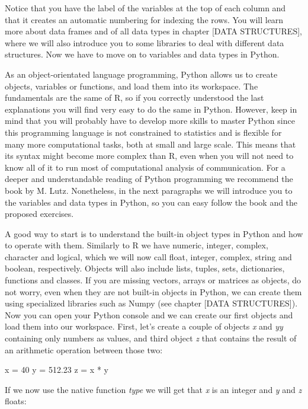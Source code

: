 Notice that you have the label of the variables at the top of each column and that it creates an automatic numbering for indexing the rows.  You will learn more about data frames and of all data types in chapter [DATA STRUCTURES], where we will also introduce you to some libraries to deal with different data structures. Now we have to move on to variables and data types in Python.

As an object-orientated language programming, Python allows us to create objects, variables or functions, and load them into its workspace. The fundamentals are the same of R, so if you correctly understood the last explanations you will find very easy to do the same in Python. However, keep in mind that you will probably have to develop more skills to master Python since this programming language is not constrained to statistics and is flexible for many more computational tasks, both at small and large scale. This means that its syntax might become more complex than R, even when you will not need to know all of it to run most of computational analysis of communication.  For a deeper and understandable reading of Python programming we recommend the book by M. Lutz\cite{lutz2013learning}. Nonetheless, in the next paragraphs we will introduce you to the variables and data types in Python, so you can easy follow the book and the proposed exercises.  

A good way to start is to understand the built-in object types in Python and how to operate with them. Similarly to R we have numeric, integer, complex, character and logical, which we will now call float, integer, complex, string and boolean, respectively. Objects will also include lists, tuples, sets, dictionaries, functions and classes. If you are missing vectors, arrays or matrices as objects, do not worry, even when they are not built-in objects in Python, we can create them using specialized libraries such as Numpy (see chapter [DATA STRUCTURES]). Now you can open your Python console and we can create our first objects and load them into our workspace. First, let’s create a couple of objects \emph{x} and \emph{yy} containing only numbers as values, and third object \emph{z} that contains the result of an arithmetic operation between those two:

\begin{examplepy}
x = 40
y = 512.23
z = x * y
\end{examplepy}

If we now use the native function \emph{type} we will get that \emph{x} is an integer and \emph{y} and \emph{z} floats:

